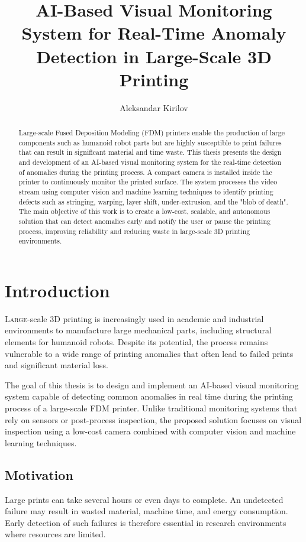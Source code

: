 \documentclass[english, Lau, oneside]{sapthesis}
\title{AI-Based Visual Monitoring System for Real-Time Anomaly Detection in Large-Scale 3D Printing}
\author{Aleksandar Kirilov}
\begin{document}
\frontmatter
\maketitle

\begin{abstract}
Large-scale Fused Deposition Modeling (FDM) printers enable the production of large components such as humanoid robot parts but are highly susceptible to print failures that can result in significant material and time waste. This thesis presents the design and development of an AI-based visual monitoring system for the real-time detection of anomalies during the printing process. A compact camera is installed inside the printer to continuously monitor the printed surface. The system processes the video stream using computer vision and machine learning techniques to identify printing defects such as stringing, warping, layer shift, under-extrusion, and the "blob of death". The main objective of this work is to create a low-cost, scalable, and autonomous solution that can detect anomalies early and notify the user or pause the printing process, improving reliability and reducing waste in large-scale 3D printing environments.
\end{abstract}

\tableofcontents

\mainmatter

\chapter{Introduction}
\label{chap:introduction}

\lettrine[lines=3]{L}{arge}-scale 3D printing is increasingly used in academic and industrial environments to manufacture large mechanical parts, including structural elements for humanoid robots. Despite its potential, the process remains vulnerable to a wide range of printing anomalies that often lead to failed prints and significant material loss.

The goal of this thesis is to design and implement an AI-based visual monitoring system capable of detecting common anomalies in real time during the printing process of a large-scale FDM printer. Unlike traditional monitoring systems that rely on sensors or post-process inspection, the proposed solution focuses on visual inspection using a low-cost camera combined with computer vision and machine learning techniques.

\section{Motivation}
Large prints can take several hours or even days to complete. An undetected failure may result in wasted material, machine time, and energy consumption. Early detection of such failures is therefore essential in research environments where resources are limited.
\end{document}

